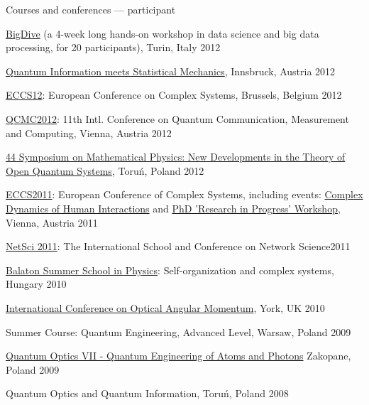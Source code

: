 \documentclass[margin,line]{resume}
\begin{document}
\begin{resume}
	Courses and conferences --- participant 
	        \begin{list2}
        \item \href{http://bigdive.eu}{BigDive} (a 4-week long hands-on workshop in data science and big data processing, for 20 participants), Turin, Italy \hfill {2012}
        \item \href{http://www.uibk.ac.at/th-physik/qism2012/}{Quantum Information meets Statistical Mechanics}, Innsbruck, Austria \hfill 2012
        \item \href{http://www.eccs2012.eu/}{ECCS12}: European Conference on Complex Systems, Brussels, Belgium \hfill 2012
        \item \href{http://qcmc2012.org/}{QCMC2012}: 11th Intl. Conference on Quantum Communication, Measurement and Computing, Vienna, Austria \hfill 2012
        \item \href{http://www.fizyka.umk.pl/zfmis/smp44/}{44 Symposium on Mathematical Physics: New Developments in the Theory of Open Quantum Systems}, Toruń, Poland  \hfill 2012
	    \item \href{http://www.eccs2011.eu/}{ECCS2011}: European Conference of Complex Systems, including events: \href{http://markov.uc3m.es/complexdynamics11/Home.html}{Complex Dynamics of Human Interactions} and \href{http://cssociety.org/PhDVienna2011}{PhD 'Research in Progress' Workshop}, Vienna, Austria  \hfill 2011
	    \item \href{http://netsci2011.net/}{NetSci 2011}: The International School and Conference on Network Science\hfill 2011
	    \item \href{http://bss.mafihe.hu/}{Balaton Summer School in Physics}: Self-organization and complex systems, Hungary \hfill 2010
        \item \href{http://www.icoam.org/}{International Conference on Optical Angular Momentum}, York, UK \hfill 2010
        \item {Summer Course: Quantum Engineering, Advanced Level}, Warsaw, Poland \hfill 2009
        \item \href{http://www.cft.edu.pl/QuantumOpticsVII/}{Quantum Optics VII - Quantum Engineering of Atoms and Photons} Zakopane, Poland \hfill 2009
        \item {Quantum Optics and Quantum Information}, Toruń, Poland \hfill 2008 
                \end{list2} 
       

\end{resume}
\end{document}
